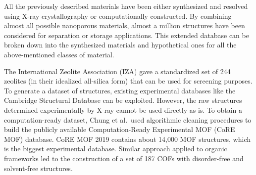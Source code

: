 \documentclass[main.tex]{subfiles}
\begin{document}
All the previously described materials have been either synthesized and resolved using X-ray crystallography or computationally constructed. By combining almost all possible nanoporous materials, almost a million structures have been considered for separation or storage applications.\autocite{Simon_2015,Simon_2015_EES,Thornton_2017} This extended database can be broken down into the synthesized materials and hypothetical ones for all the above-mentioned classes of material.

The International Zeolite Association (IZA) gave a standardized set of 244 zeolites (in their idealized all-silica form) that can be used for screening purposes. To generate a dataset of structures, existing experimental databases like the Cambridge Structural Database can be exploited. However, the raw structures determined experimentally by X-ray cannot be used directly as is. To obtain a computation-ready dataset, Chung et al.\ used algorithmic cleaning procedures to build the publicly available Computation-Ready Experimental MOF (CoRE MOF) database.\autocite{Chung_2014, Chung_2019} CoRE MOF 2019 contains about 14,000 MOF structures, which is the biggest experimental database. Similar approach applied to organic frameworks led to the construction of a set of 187 COFs with disorder-free and solvent-free structures.\autocite{Tong_2017,Ongari_2019}
\end{document}
